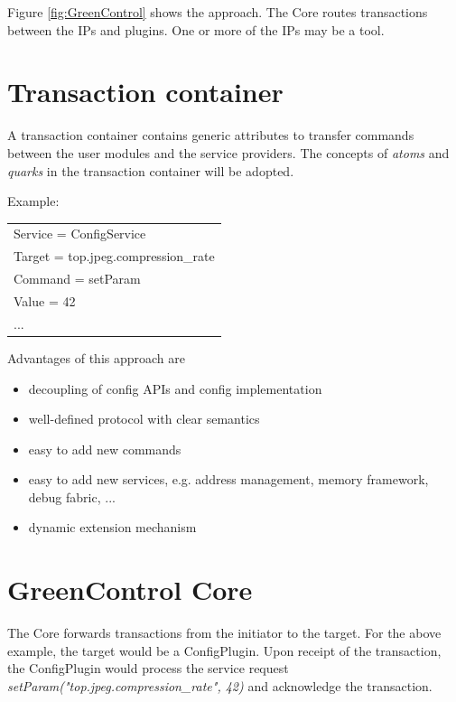 Figure \ref{fig:GreenControl} shows the approach. The \GreenControl Core routes transactions between the IPs and plugins. One or more of the IPs may be a tool.



\section{Transaction container}
A transaction container contains generic attributes to transfer commands between the user modules and the service providers. The concepts of {\em atoms} and {\em quarks} in the \GreenBus transaction container will be adopted. 

\noindent
\begin{minipage}{\textwidth}
Example: 

\begin{tabular}{|l|}
	\cline{1-1} Service = ConfigService   \\ 
	\cline{1-1} Target = top.jpeg.compression\_rate   \\ 
	\cline{1-1} Command = setParam   \\ 
	\cline{1-1} Value = 42   \\ 
	\cline{1-1} ...   \\ 
	\hline
\end{tabular}
\end{minipage}

Advantages of this approach are 
\begin{itemize}
	\item decoupling of config APIs and config implementation 
	\item well-defined protocol with clear semantics 
	\item easy to add new commands 
	\item easy to add new services, e.g. address management, memory framework, debug fabric, ... 
	\item dynamic extension mechanism
\end{itemize}


\section{GreenControl Core}
The Core forwards transactions from the initiator to the target. For the above example, the target would be a ConfigPlugin. Upon receipt of the transaction, the ConfigPlugin would process the service request {\em setParam("top.jpeg.compression\_rate", 42)} and acknowledge the transaction. 

